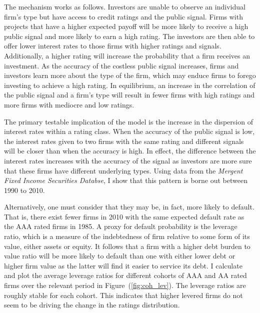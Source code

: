 \documentclass[titlepage]{article}
\begin{document}
The mechanism works as follows. Investors are unable to observe an individual firm's type but have access to credit ratings and the public signal. Firms with projects that have a higher expected payoff will be more likely to receive a high public signal and more likely to earn a high rating. The investors are then able to offer lower interest rates to those firms with higher ratings and signals. Additionally, a higher rating will increase the probability that a firm receives an investment. As the accuracy of the costless public signal increases, firms and investors learn more about the type of the firm, which may enduce firms to forego investing to achieve a high rating. In equilibrium, an increase in the correlation of the public signal and a firm's type will result in fewer firms with high ratings and more firms with mediocre and low ratings.

The primary testable implication of the model is the increase in the dispersion of interest rates within a rating class. When the accuracy of the public signal is low, the interest rates given to two firms with the same rating and different signals will be closer than when the accuracy is high. In effect, the difference between the interest rates increases with the accuracy of the signal as investors are more sure that these firms have different underlying types. Using data from the \textit{Mergent Fixed Income Securities Databse}, I show that this pattern is borne out between 1990 to 2010. 


Alternatively, one must consider that they may be, in fact, more likely to default. That is, there exist fewer firms in 2010 with the same expected default rate as the AAA rated firms in 1985. A proxy for default probability is the leverage ratio, which is a measure of the indebtedness of firm relative to some form of its value, either assets or equity. It follows that a firm with a higher debt burden to value ratio will be more likely to default than one with either lower debt or higher firm value as the latter will find it easier to service its debt. I calculate and plot the average leverage ratios for different cohorts of AAA and AA rated firms over the relevant period in Figure~(\ref{fig:coh_lev}). The leverage ratios are roughly stable for each cohort. This indicates that higher levered firms do not seem to be driving the change in the ratings distribution.
\end{document}
